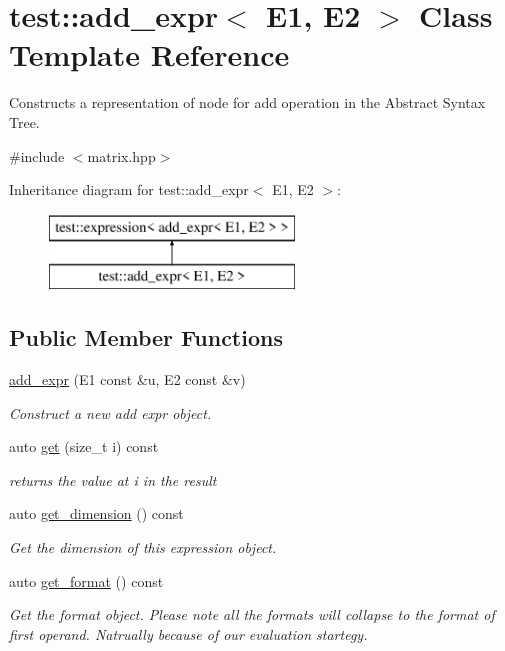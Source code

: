 \hypertarget{classtest_1_1add__expr}{}\section{test\+::add\+\_\+expr$<$ E1, E2 $>$ Class Template Reference}
\label{classtest_1_1add__expr}


Constructs a representation of node for add operation in the Abstract Syntax Tree.  




{\ttfamily \#include $<$matrix.\+hpp$>$}

Inheritance diagram for test\+::add\+\_\+expr$<$ E1, E2 $>$\+:\begin{figure}[H]
\begin{center}
\leavevmode
\includegraphics[height=2.000000cm]{classtest_1_1add__expr}
\end{center}
\end{figure}
\subsection*{Public Member Functions}
\begin{DoxyCompactItemize}
\item 
\mbox{\hyperlink{classtest_1_1add__expr_a1c76d0d18615c7ddabb4323a7ea4c885}{add\+\_\+expr}} (E1 const \&u, E2 const \&v)
\begin{DoxyCompactList}\small\item\em Construct a new add expr object. \end{DoxyCompactList}\item 
auto \mbox{\hyperlink{classtest_1_1add__expr_a21308cdf6f09407cbe087ae4bd77e341}{get}} (size\+\_\+t i) const
\begin{DoxyCompactList}\small\item\em returns the value at i in the result \end{DoxyCompactList}\item 
auto \mbox{\hyperlink{classtest_1_1add__expr_a6851920fd85d3dcbf8396f3c445b73a4}{get\+\_\+dimension}} () const
\begin{DoxyCompactList}\small\item\em Get the dimension of this expression object. \end{DoxyCompactList}\item 
auto \mbox{\hyperlink{classtest_1_1add__expr_a98c4415c877e86fb75a46017414e1ef7}{get\+\_\+format}} () const
\begin{DoxyCompactList}\small\item\em Get the format object. Please note all the formats will collapse to the format of first operand. Natrually because of our evaluation startegy. \end{DoxyCompactList}\end{DoxyCompactItemize}


